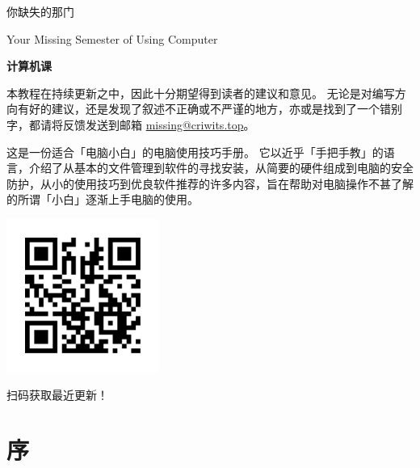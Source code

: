 \documentclass[a4paper]{book}
\date{\today}
\begin{document}
\maketitle

\frontmatter

\thispagestyle{empty}
\begin{center}
  \vspace*{2.5cm}
  \fontsize{42pt}{54pt}\selectfont{}\textsf{你缺失的那门}\par
  \fontsize{18pt}{18pt}\selectfont{}\textsf{Your Missing Semester of Using Computer}\par
  \fontsize{54pt}{8pt}\selectfont{}\textbf{\textsf{计算机课}}\par
  \vspace*{3.6cm}
\end{center}

\begin{note}
  本教程在持续更新之中，因此十分期望得到读者的建议和意见。
  无论是对编写方向有好的建议，还是发现了叙述不正确或不严谨的地方，亦或是找到了一个错别字，都请将反馈发送到邮箱 \href{mailto:missing@criwits.top}{missing@criwits.top}。
\end{note}

这是一份适合「电脑小白」的电脑使用技巧手册。
它以近乎「手把手教」的语言，介绍了从基本的文件管理到软件的寻找安装，从简要的硬件组成到电脑的安全防护，从小的使用技巧到优良软件推荐的许多内容，旨在帮助对电脑操作不甚了解的所谓「小白」逐渐上手电脑的使用。

\begin{center}
  \vspace*{1cm}
  \includegraphics[width=5cm]{src/QR_CODE.png}\par
  扫码获取最近更新！
\end{center}  

\renewcommand\thefootnote{\fnsymbol{footnote}}
\tableofcontents
\renewcommand\thefootnote{\arabic{footnote}}

\chapter{序}
\end{document}
